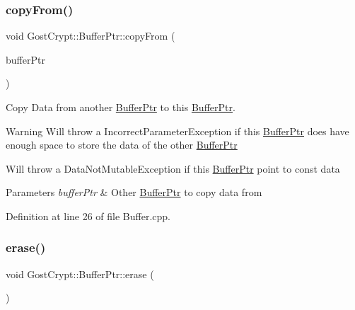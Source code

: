 \subsubsection{\texorpdfstring{copy\+From()}{copyFrom()}}
{\footnotesize\ttfamily void Gost\+Crypt\+::\+Buffer\+Ptr\+::copy\+From (\begin{DoxyParamCaption}\item[{const \hyperlink{class_gost_crypt_1_1_buffer_ptr}{Buffer\+Ptr} \&}]{buffer\+Ptr }\end{DoxyParamCaption})}



Copy Data from another \hyperlink{class_gost_crypt_1_1_buffer_ptr}{Buffer\+Ptr} to this \hyperlink{class_gost_crypt_1_1_buffer_ptr}{Buffer\+Ptr}. 

\begin{DoxyWarning}{Warning}
Will throw a Incorrect\+Parameter\+Exception if this \hyperlink{class_gost_crypt_1_1_buffer_ptr}{Buffer\+Ptr} does have enough space to store the data of the other \hyperlink{class_gost_crypt_1_1_buffer_ptr}{Buffer\+Ptr} 

Will throw a Data\+Not\+Mutable\+Exception if this \hyperlink{class_gost_crypt_1_1_buffer_ptr}{Buffer\+Ptr} point to const data 
\end{DoxyWarning}

\begin{DoxyParams}{Parameters}
{\em buffer\+Ptr} & Other \hyperlink{class_gost_crypt_1_1_buffer_ptr}{Buffer\+Ptr} to copy data from \\
\hline
\end{DoxyParams}


Definition at line 26 of file Buffer.\+cpp.

\mbox{\label{class_gost_crypt_1_1_buffer_ptr_abb781db760af4ff975c6f98eaf669dfe}} 
\subsubsection{\texorpdfstring{erase()}{erase()}}
{\footnotesize\ttfamily void Gost\+Crypt\+::\+Buffer\+Ptr\+::erase (\begin{DoxyParamCaption}{ }\end{DoxyParamCaption})\hspace{0.3cm}{\ttfamily [inline]}}




